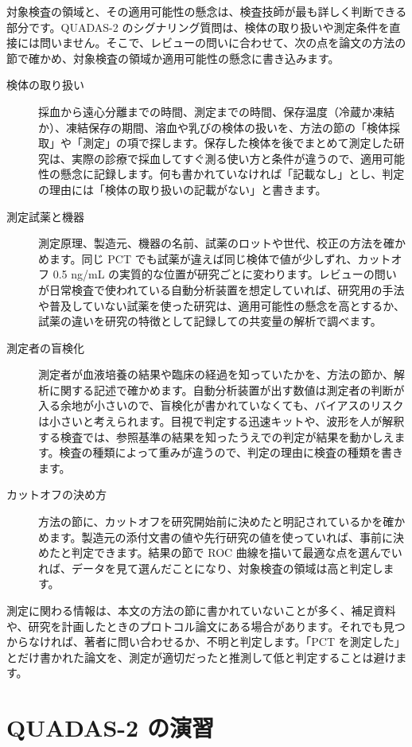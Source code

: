 対象検査の領域と、その適用可能性の懸念は、検査技師が最も詳しく判断できる部分です。QUADAS-2 のシグナリング質問は、検体の取り扱いや測定条件を直接には問いません。そこで、レビューの問いに合わせて、次の点を論文の方法の節で確かめ、対象検査の領域か適用可能性の懸念に書き込みます。
\begin{description}
\item[検体の取り扱い] 採血から遠心分離までの時間、測定までの時間、保存温度（冷蔵か凍結か）、凍結保存の期間、溶血や乳びの検体の扱いを、方法の節の「検体採取」や「測定」の項で探します。保存した検体を後でまとめて測定した研究は、実際の診療で採血してすぐ測る使い方と条件が違うので、適用可能性の懸念に記録します。何も書かれていなければ「記載なし」とし、判定の理由には「検体の取り扱いの記載がない」と書きます。
\item[測定試薬と機器] 測定原理、製造元、機器の名前、試薬のロットや世代、校正の方法を確かめます。同じ PCT でも試薬が違えば同じ検体で値が少しずれ、カットオフ 0.5 ng/mL の実質的な位置が研究ごとに変わります。レビューの問いが日常検査で使われている自動分析装置を想定していれば、研究用の手法や普及していない試薬を使った研究は、適用可能性の懸念を高とするか、試薬の違いを研究の特徴として記録しての共変量の解析で調べます。
\item[測定者の盲検化] 測定者が血液培養の結果や臨床の経過を知っていたかを、方法の節か、解析に関する記述で確かめます。自動分析装置が出す数値は測定者の判断が入る余地が小さいので、盲検化が書かれていなくても、バイアスのリスクは小さいと考えられます。目視で判定する迅速キットや、波形を人が解釈する検査では、参照基準の結果を知ったうえでの判定が結果を動かしえます。検査の種類によって重みが違うので、判定の理由に検査の種類を書きます。
\item[カットオフの決め方] 方法の節に、カットオフを研究開始前に決めたと明記されているかを確かめます。製造元の添付文書の値や先行研究の値を使っていれば、事前に決めたと判定できます。結果の節で ROC 曲線を描いて最適な点を選んでいれば、データを見て選んだことになり、対象検査の領域は高と判定します。
\end{description}

測定に関わる情報は、本文の方法の節に書かれていないことが多く、補足資料や、研究を計画したときのプロトコル論文にある場合があります。それでも見つからなければ、著者に問い合わせるか、不明と判定します。「PCT を測定した」とだけ書かれた論文を、測定が適切だったと推測して低と判定することは避けます。

\section{QUADAS-2 の演習}
\label{sec:12-7}

